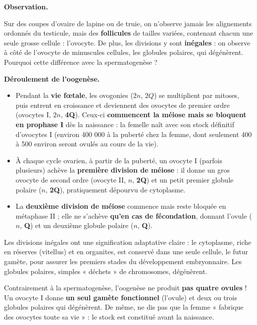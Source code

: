 \documentclass[11pt]{article}
\newcommand{\cle}[1]{{\popxbold\color{popdark}#1}}
\begin{document}
\textbf{Observation.}\par
Sur des coupes d'ovaire de lapine ou de truie, on n'observe jamais les alignements ordonnés du testicule, mais des \textbf{follicules} de tailles variées, contenant chacun une seule grosse cellule : l'ovocyte. De plus, les divisions y sont \textbf{inégales} : on observe à côté de l'ovocyte de minuscules cellules, les globules polaires, qui dégénèrent. Pourquoi cette différence avec la spermatogenèse ?

\textbf{Déroulement de l'oogenèse.}\par
\begin{itemize}
\item Pendant la \textbf{vie fœtale}, les \cle{ovogonies} ($2n$, $2Q$) se multiplient par mitoses, puis entrent en croissance et deviennent des \cle{ovocytes de premier ordre} (ovocytes I, $2n$, \textbf{4Q}). Ceux-ci \textbf{commencent la méiose mais se bloquent en prophase I} dès la naissance : la femelle naît avec son stock définitif d'ovocytes I (environ 400 000 à la puberté chez la femme, dont seulement 400 à 500 environ seront ovulés au cours de la vie).
\item À chaque cycle ovarien, à partir de la puberté, un ovocyte I (parfois plusieurs) achève la \textbf{première division de méiose} : il donne un gros \cle{ovocyte de second ordre} (ovocyte II, $n$, \textbf{2Q}) et un petit \cle{premier globule polaire} ($n$, \textbf{2Q}), pratiquement dépourvu de cytoplasme.
\item La \textbf{deuxième division de méiose} commence mais reste bloquée en métaphase II ; elle ne s'achève \textbf{qu'en cas de fécondation}, donnant l'\cle{ovule} ($n$, \textbf{Q}) et un \cle{deuxième globule polaire} ($n$, \textbf{Q}).
\end{itemize}

Les divisions inégales ont une signification adaptative claire : le cytoplasme, riche en réserves (vitellus) et en organites, est conservé dans une seule cellule, le futur gamète, pour assurer les premiers stades du développement embryonnaire. Les globules polaires, simples « déchets » de chromosomes, dégénèrent.

\begin{attention}
Contrairement à la spermatogenèse, l'oogenèse ne produit \textbf{pas quatre ovules} ! Un ovocyte I donne \textbf{un seul gamète fonctionnel} (l'ovule) et deux ou trois globules polaires qui dégénèrent. De même, ne dis pas que la femme « fabrique des ovocytes toute sa vie » : le stock est constitué avant la naissance.
\end{attention}
\end{document}
